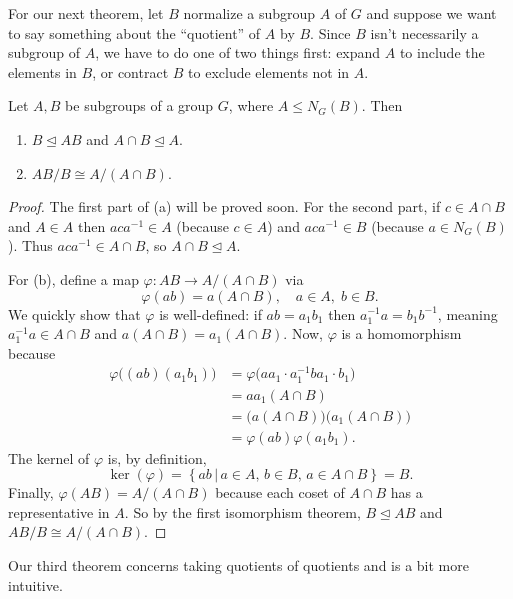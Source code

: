 \documentclass[../m171main.tex]{subfiles}
\begin{document}
For our next theorem, let $B$ normalize a subgroup $A$ of $G$ and suppose we want to say something about the ``quotient'' of $A$ by $B$.
Since $B$ isn't necessarily a subgroup of $A$, we have to do one of two things first: expand $A$ to include the elements in $B$, or contract $B$ to exclude elements not in $A$.

\begin{theorem}
    Let $A,B$ be subgroups of a group $G$, where $A \leq N_G(B)$.
    Then
    \begin{enumerate}[label=(\alph*)]
        \item $B \trianglelefteq AB$ and $A \cap B \trianglelefteq A$.
        \item $AB / B \cong A / (A \cap B)$.
    \end{enumerate}
\end{theorem}

\begin{proof}
    The first part of (a) will be proved soon.
    For the second part, if $c \in A \cap B$ and $A \in A$ then $aca^{-1} \in A$ (because $c \in A$) and $aca^{-1} \in B$ (because $a \in N_G(B)$).
    Thus $aca^{-1} \in A \cap B$, so $A \cap B \trianglelefteq A$.

    For (b), define a map $\varphi : AB \to A / (A \cap B)$ via
    \[ \varphi(ab) = a (A \cap B), \quad a \in A, \; b \in B. \]
    We quickly show that $\varphi$ is well-defined: if $ab = a_1b_1$ then $a_1^{-1} a = b_1b^{-1}$, meaning $a_1^{-1} a \in A \cap B$ and $a (A \cap B) = a_1 (A \cap B)$.
    Now, $\varphi$ is a homomorphism because
    \begin{align*}
        \varphi \big( (ab) (a_1 b_1) \big) &= \varphi \big( aa_1 \cdot a_1^{-1} b a_1 \cdot b_1 \big) \\
        &= aa_1 (A \cap B) \\
        &= \big( a (A \cap B) \big) \big( a_1 (A \cap B) \big) \\
        &= \varphi(ab) \varphi(a_1 b_1).
    \end{align*}
    The kernel of $\varphi$ is, by definition,
    \[ \ker(\varphi) = \left\{ ab \,|\, a \in A, \, b \in B, \, a \in A \cap B \right\} = B. \]
    Finally, $\varphi(AB) = A / (A \cap B)$ because each coset of $A \cap B$ has a representative in $A$.
    So by the first isomorphism theorem, $B \trianglelefteq AB$ and $AB / B \cong A / (A \cap B)$.
\end{proof}

Our third theorem concerns taking quotients of quotients and is a bit more intuitive.
\end{document}
